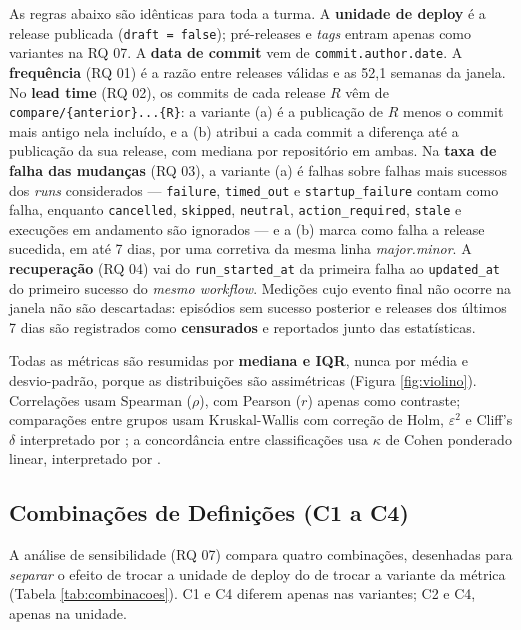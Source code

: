 As regras abaixo são idênticas para toda a turma. A \textbf{unidade de deploy} é a release
publicada (\texttt{draft = false}); pré-releases e \emph{tags} entram apenas como variantes na
RQ 07. A \textbf{data de commit} vem de \texttt{commit.author.date}. A \textbf{frequência}
(RQ 01) é a razão entre releases válidas e as 52,1 semanas da janela. No \textbf{lead time}
(RQ 02), os commits de cada release $R$ vêm de \texttt{compare/\{anterior\}...\{R\}}: a
variante (a) é a publicação de $R$ menos o commit mais antigo nela incluído, e a (b) atribui a
cada commit a diferença até a publicação da sua release, com mediana por repositório em ambas.
Na \textbf{taxa de falha das mudanças} (RQ 03), a variante (a) é falhas sobre falhas mais sucessos dos \emph{runs}
considerados --- \texttt{failure}, \texttt{timed\_out} e \texttt{startup\_failure} contam como
falha, enquanto \texttt{cancelled}, \texttt{skipped}, \texttt{neutral},
\texttt{action\_required}, \texttt{stale} e execuções em andamento são ignorados --- e a (b)
marca como falha a release sucedida, em até 7 dias, por uma corretiva da mesma linha
\emph{major.minor}. A \textbf{recuperação} (RQ 04) vai do \texttt{run\_started\_at} da
primeira falha ao \texttt{updated\_at} do primeiro sucesso do \emph{mesmo workflow}. Medições
cujo evento final não ocorre na janela não são descartadas: episódios sem sucesso posterior e
releases dos últimos 7 dias são registrados como \textbf{censurados} e reportados junto das
estatísticas.

Todas as métricas são resumidas por \textbf{mediana e IQR}, nunca por média e
desvio-padrão, porque as distribuições são assimétricas (Figura \ref{fig:violino}).
Correlações usam Spearman ($\rho$), com Pearson ($r$) apenas como contraste; comparações
entre grupos usam Kruskal-Wallis com correção de Holm, $\varepsilon^2$ e Cliff's $\delta$
interpretado por ; a concordância entre classificações usa $\kappa$
de Cohen ponderado linear, interpretado por .

\subsection{Combinações de Definições (C1 a C4)}

A análise de sensibilidade (RQ 07) compara quatro combinações, desenhadas para
\emph{separar} o efeito de trocar a unidade de deploy do de trocar a variante da métrica
(Tabela \ref{tab:combinacoes}). C1 e C4 diferem apenas nas variantes; C2 e C4, apenas na
unidade.

